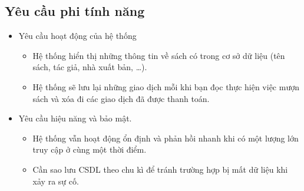 \documentclass[12pt]{report}
\begin{document}
\subsection{Yêu cầu phi tính năng}
\begin{itemize}
    \item Yêu cầu hoạt động của hệ thống
        \begin{itemize}
            \item Hệ thống hiển thị những thông tin về sách có trong cơ sở 
                dữ liệu (tên sách, tác giả, nhà xuất bản, \dots).
            \item Hệ thống sẽ lưu lại những giao dịch mỗi khi bạn đọc thực hiện 
                việc mượn sách và xóa đi các giao dịch đã được thanh toán. 
        \end{itemize}
    \item Yêu cầu hiệu năng và bảo mật. 
        \begin{itemize}
            \item Hệ thống vẫn hoạt động ổn định và phản hồi nhanh khi có một lượng lớn truy cập ở cùng một thời điểm. 
            \item Cần sao lưu CSDL theo chu kì để tránh trường hợp bị mất dữ liệu khi xảy ra sự cố. 
        \end{itemize}
\end{itemize}
\end{document}
